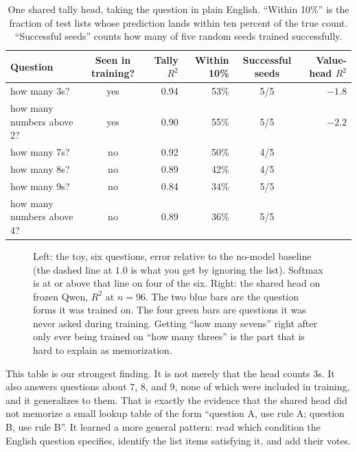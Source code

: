 \documentclass[10pt]{article}
\theoremstyle{definition}
\begin{document}
\begin{table}[htbp]
\centering
\caption{One shared tally head, taking the question in plain English.
``Within 10\%'' is the fraction of test lists whose prediction lands
within ten percent of the true count. ``Successful seeds'' counts how many
of five random seeds trained successfully.}
\label{tab:shared}
\small
\begin{tabular}{@{}lcrrcr@{}}
\toprule
\textbf{Question} & \textbf{Seen in training?} & \textbf{Tally $R^2$} &
\textbf{Within 10\%} & \textbf{Successful seeds} & \textbf{Value-head $R^2$} \\
\midrule
how many 3s?                  & yes & 0.94 & 53\% & 5/5 & $-1.8$ \\
how many numbers above 2?     & yes & 0.90 & 55\% & 5/5 & $-2.2$ \\
how many 7s?                  & no  & 0.92 & 50\% & 4/5 & \\
how many 8s?                  & no  & 0.89 & 42\% & 4/5 & \\
how many 9s?                  & no  & 0.84 & 34\% & 5/5 & \\
how many numbers above 4?     & no  & 0.89 & 36\% & 5/5 & \\
\bottomrule
\end{tabular}
\end{table}


\begin{figure}[htbp]
\centering

\caption{Left: the toy, six questions, error relative to the no-model
baseline (the dashed line at $1.0$ is what you get by ignoring the list).
Softmax is at or above that line on four of the six. Right: the shared
head on frozen Qwen, $R^2$ at $n=96$. The two blue bars are the question
forms it was trained on. The four green bars are questions it was never
asked during training. Getting ``how many sevens'' right after only ever
being trained on ``how many threes'' is the part that is hard to explain
as memorization.}
\label{fig:sixquestions}
\end{figure}

This table is our strongest finding. It is not merely that the head counts
$3$s. It also answers questions about $7$, $8$, and $9$, none of which were
included in training, and it generalizes to them. That is exactly the
evidence that the shared head did not memorize a small lookup table of the
form ``question A, use rule A; question B, use rule B''. It learned a more
general pattern: read which condition the English question specifies,
identify the list items satisfying it, and add their votes.
\end{document}
